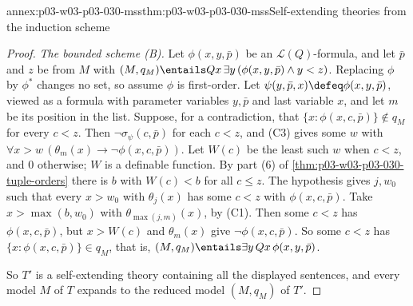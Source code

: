 \begin{annexitem}{annex:p03-w03-p03-030-mss}{thm:p03-w03-p03-030-mss}{Self-extending theories from the induction scheme}
\begin{proof}
\emph{The bounded scheme (B).}  Let \(\phi(x,y,\bar p)\) be an \(\mathscr
L(Q)\)-formula, and let \(\bar p\) and \(z\) be from \(M\) with \((M,q_M)\entails
Qx\,\exists y\,(\phi(x,y,\bar p)\wedge y<z)\).  Replacing \(\phi\) by
\(\phi^*\) changes no set, so assume \(\phi\) is first-order.  Let
\(\psi(y,\bar p,x)\defeq\phi(x,y,\bar p)\), viewed as a formula with
parameter variables \(y,\bar p\) and last variable \(x\), and let \(m\) be
its position in the list.  Suppose, for a contradiction, that
\(\{x:\phi(x,c,\bar p)\}\notin q_M\) for every \(c<z\).  Then
\(\neg\sigma_\psi(c,\bar p)\) for each \(c<z\), and (C3) gives some \(w\) with
\(\forall x>w\,(\theta_m(x)\rightarrow\neg\phi(x,c,\bar p))\).  Let \(W(c)\)
be the least such \(w\) when \(c<z\), and \(0\) otherwise; \(W\) is a definable
function.  By part (6) of \cref{thm:p03-w03-p03-030-tuple-orders} there is
\(b\) with \(W(c)<b\) for all \(c\le z\).  The hypothesis gives \(j,w_0\) such
that every \(x>w_0\) with \(\theta_j(x)\) has some \(c<z\) with
\(\phi(x,c,\bar p)\).  Take \(x>\max(b,w_0)\) with
\(\theta_{\max(j,m)}(x)\), by (C1).  Then some \(c<z\) has \(\phi(x,c,\bar
p)\), but \(x>W(c)\) and \(\theta_m(x)\) give \(\neg\phi(x,c,\bar p)\).  So
some \(c<z\) has \(\{x:\phi(x,c,\bar p)\}\in q_M\), that is,
\((M,q_M)\entails\exists y\,Qx\,\phi(x,y,\bar p)\).

So \(T'\) is a self-extending theory containing all the displayed sentences,
and every model \(M\) of \(T\) expands to the reduced model \((M,q_M)\) of
\(T'\).
\end{proof}
\end{annexitem}

